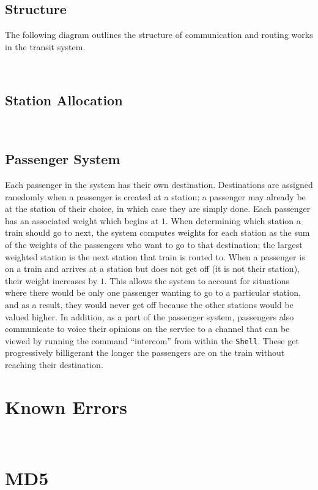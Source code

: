 \documentclass[12pt]{article}
\begin{document}
\subsection{Structure}
The following diagram outlines the structure of communication and routing works in the transit system.
\begin{center}
  \\[1\baselineskip]
\end{center}
\subsection{Station Allocation}
\\[1\baselineskip]
\subsection{Passenger System}
Each passenger in the system has their own destination.  Destinations are assigned ranedomly when a passenger is created at a station; a passenger may already be at the station of their choice, in which case they are simply done.  Each passenger has an associated weight which begins at $1$.  When determining which station a train should go to next, the system computes weights for each station as the sum of the weights of the passengers who want to go to that destination; the largest weighted station is the next station that train is routed to.  When a passenger is on a train and arrives at a station but does not get off (it is not their station), their weight increases by $1$.  This allows the system to account for situations where there would be only one passenger wanting to go to a particular station, and as a result, they would never get off because the other stations would be valued higher.  In addition, as a part of the passenger system, passengers also communicate to voice their opinions on the service to a channel that can be viewed by running the command ``intercom'' from within the \texttt{Shell}.  These get progressively billigerant the longer the passengers are on the train without reaching their destination.
\\[2\baselineskip]
\section{Known Errors}
\\[2\baselineskip]
\section{MD5}

\end{document}

